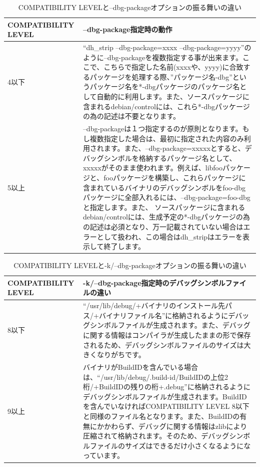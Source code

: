 \documentclass[mingoth,a4paper]{jsarticle}
\begin{document}
\begin{table}[ht]
\begin{center}
\small
\begin{tabular}{|p{8em}|p{35em}|}
\hline
COMPATIBILITY LEVEL &--dbg-package指定時の動作 \\ \hline \hline
4以下 & ``dh\_strip --dbg-package=xxxx --dbg-package=yyyy''のように--dbg-packageを複数指定する事が出来ます。ここで、こちらで指定した名前(xxxxや、yyyy)に合致するパッケージを処理する際、''パッケージ名-dbg''というパッケージ名を*-dbgパッケージのパッケージ名として自動的に利用します。また、ソースパッケージに含まれるdebian/controlには、これら*-dbgパッケージの為の記述は不要となります。\\ \hline
5以上 & --dbg-packageは１つ指定するのが原則となります。もし複数指定した場合は、最初に指定された内容のみ利用されます。また、--dbg-package=xxxxxとすると、デバッグシンボルを格納するパッケージ名として、xxxxxがそのまま使われます。例えば、libfooパッケージと、fooパッケージを構築し、これらパッケージに含まれているバイナリのデバッグシンボルをfoo-dbgパッケージに全部入れるには、--dbg-package=foo-dbgと指定します。また、
ソースパッケージに含まれるdebian/controlには、生成予定の*-dbgパッケージの為の記述は必須となり、万一記載されていない場合はエラーとして扱われ、この場合はdh\_stripはエラーを表示して終了します。\\ \hline
\end{tabular}
\caption{COMPATIBILITY LEVELと--dbg-packageオプションの振る舞いの違い}
\label{tab:dh-strip-comp-level}
\end{center}
\end{table}

\begin{table}[ht]
\begin{center}
\small
\begin{tabular}{|p{8em}|p{35em}|}
\hline
COMPATIBILITY LEVEL &-k/--dbg-package指定時のデバッグシンボルファイルの違い \\ \hline \hline
8以下 & ``/usr/lib/debug/+バイナリのインストール先パス/+バイナリファイル名''に格納されるようにデバッグシンボルファイルが生成されます。また、デバッグに関する情報はコンパイラが生成したままの形で保存されるため、デバッグシンボルファイルのサイズは大きくなりがちです。\\ \hline
9以上 & バイナリがBuildID\cite{gdb-python-debug2}を含んでいる場合は、``/usr/lib/debug/.build-id/BuildIDの上位2桁/+BuildIDの残りの桁+.debug''に格納されるようにデバッグシンボルファイルが生成されます。BuildIDを含んでいなければCOMPATIBILITY LEVEL 8以下と同様のファイル名となります。また、BuildIDの有無にかかわらず、デバッグに関する情報はzlibにより圧縮されて格納されます。そのため、デバッグシンボルファイルのサイズはできるだけ小さくなるようになっています。\\ \hline
\end{tabular}
\caption{COMPATIBILITY LEVELと-k/--dbg-packageオプションの振る舞いの違い}
\label{tab:debugsym-file-difference-comp-level}
\end{center}
\end{table}
\end{document}

